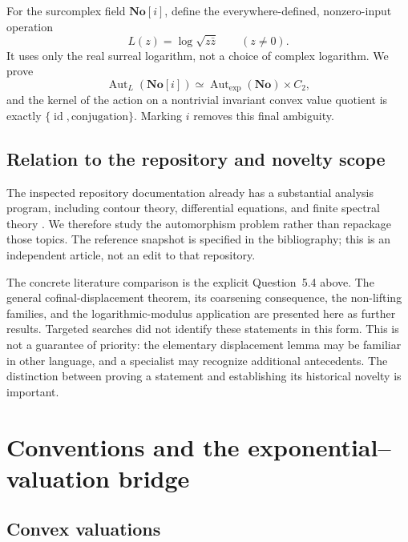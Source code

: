 \documentclass[11pt]{article}
\theoremstyle{definition}
\theoremstyle{remark}
\newcommand{\No}{\mathbf{No}}
\newcommand{\id}{\operatorname{id}}
\newcommand{\Gexp}{\operatorname{Aut}_{\exp}}
\newcommand{\GLmod}{\operatorname{Aut}_{L}}
\numberwithin{equation}{section}
\begin{document}
For the surcomplex field $\No[i]$, define the everywhere-defined, nonzero-input
operation
\[
 L(z)=\log\sqrt{z\bar z}\qquad(z\ne0).
\]
It uses only the real surreal logarithm, not a choice of complex logarithm.
We prove
\begin{equation}\label{eq:main-complex}
 \GLmod(\No[i])\simeq\Gexp(\No)\times C_2,
\end{equation}
and the kernel of the action on a nontrivial invariant convex value quotient
is exactly $\{\id,\text{conjugation}\}$. Marking $i$ removes this final ambiguity.

\subsection{Relation to the repository and novelty scope}

The inspected repository documentation already has a substantial analysis
program, including contour theory, differential equations, and finite spectral
theory \cite{Repo}. We therefore study the automorphism problem rather than
repackage those topics. The reference snapshot is specified in the bibliography;
this is an independent article, not an edit to that repository.

The concrete literature comparison is the explicit Question~5.4 above.
The general cofinal-displacement theorem, its coarsening consequence, the
non-lifting families, and the logarithmic-modulus application are presented
here as further results. Targeted searches did not identify these statements
in this form. This is not a guarantee of priority: the elementary displacement
lemma may be familiar in other language, and a specialist may recognize
additional antecedents. The distinction between proving a statement and
establishing its historical novelty is important.

\section{Conventions and the exponential--valuation bridge}

\subsection{Convex valuations}
\end{document}
